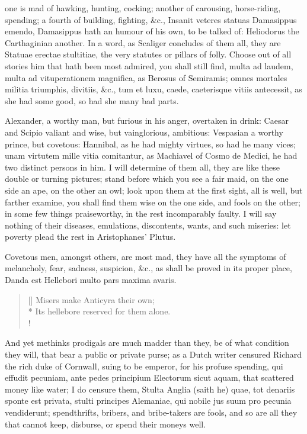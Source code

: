 {one is mad of hawking, hunting, cocking; another of carousing,
horse-riding, spending; a fourth of building, fighting, \&c., Insanit
veteres statuas Damasippus emendo, Damasippus hath an humour of his
own, to be talked of: Heliodorus the Carthaginian another. In a
word, as Scaliger concludes of them all, they are Statuae erectae
stultitiae, the very statutes or pillars of folly. Choose out of all
stories him that hath been most admired, you shall still find, multa ad
laudem, multa ad vituperationem magnifica, as Berosus of
Semiramis; omnes mortales militia triumphis, divitiis, \&c., tum et
luxu, caede, caeterisque vitiis antecessit, as she had some good, so
had she many bad parts.

Alexander, a worthy man, but furious in his anger, overtaken in drink:
Caesar and Scipio valiant and wise, but vainglorious, ambitious:
Vespasian a worthy prince, but covetous: Hannibal, as he had
mighty virtues, so had he many vices; unam virtutem mille vitia
comitantur, as Machiavel of Cosmo de Medici, he had two distinct
persons in him. I will determine of them all, they are like these
double or turning pictures; stand before which you see a fair maid, on
the one side an ape, on the other an owl; look upon them at the first
sight, all is well, but farther examine, you shall find them wise on
the one side, and fools on the other; in some few things praiseworthy,
in the rest incomparably faulty. I will say nothing of their diseases,
emulations, discontents, wants, and such miseries: let poverty plead
the rest in Aristophanes' Plutus.

Covetous men, amongst others, are most mad, they have all the
symptoms of melancholy, fear, sadness, suspicion, \&c., as shall be
proved in its proper place,
Danda est Hellebori multo pars maxima avaris.

\settowidth{\versewidth}{Its hellebore reserved for them alone.}
\begin{verse}[\versewidth]
Misers make Anticyra their own;\\*
Its hellebore reserved for them alone.\\!
\end{verse}

And yet methinks prodigals are much madder than they, be of what
condition they will, that bear a public or private purse; as a
Dutch writer censured Richard the rich duke of Cornwall, suing to
be emperor, for his profuse spending, qui effudit pecuniam, ante pedes
principium Electorum sicut aquam, that scattered money like water; I do
censure them, Stulta Anglia (saith he) quae, tot denariis sponte est
privata, stulti principes Alemaniae, qui nobile jus suum pro pecunia
vendiderunt; spendthrifts, bribers, and bribe-takers are fools, and so
are all they that cannot keep, disburse, or spend their moneys
well.

}
